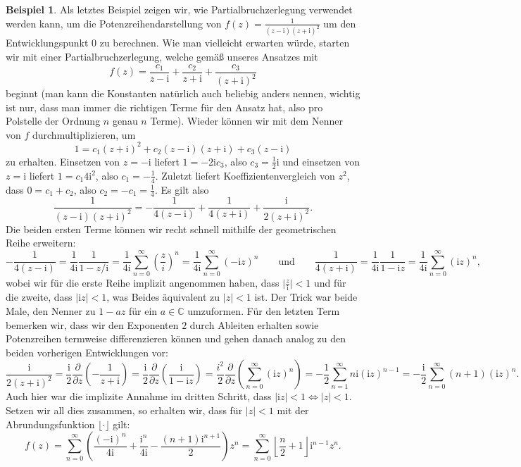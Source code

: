 \documentclass{article}
\theoremstyle{plain}
\theoremstyle{definition}
\newtheorem{example}{Beispiel}
\newcommand{\iu}{\mathrm{i}}
\begin{document}
\begin{example}
	Als letztes Beispiel zeigen wir, wie Partialbruchzerlegung verwendet werden kann, um die Potenzreihendarstellung von $f(z) = \frac{1}{(z - \iu)(z + \iu)^2}$ um den Entwicklungspunkt $0$ zu berechnen.
	Wie man vielleicht erwarten würde, starten wir mit einer Partialbruchzerlegung, welche gemäß unseres Ansatzes mit
	\[
		f(z) = \frac{c_1}{z - \iu} + \frac{c_2}{z + \iu} + \frac{c_3}{(z + \iu)^2}
	\]
	beginnt (man kann die Konstanten natürlich auch beliebig anders nennen, wichtig ist nur, dass man immer die richtigen Terme für den Ansatz hat, also pro Polstelle der Ordnung $n$ genau $n$ Terme).
	Wieder können wir mit dem Nenner von $f$ durchmultiplizieren, um
	\[
		1 = c_1 (z + \iu)^2 + c_2 (z - \iu)(z + \iu) + c_3 (z - \iu)
	\]
	zu erhalten.
	Einsetzen von $z = -\iu$ liefert $1 = -2 \iu c_3$, also $c_3 = \frac{1}{2}\iu$ und einsetzen von $z = \iu$ liefert $1 = c_1 4 \iu^2$, also $c_1 = -\frac{1}{4}$.
	Zuletzt liefert Koeffizientenvergleich von $z^2$, dass $0 = c_1 + c_2$, also $c_2 = - c_1 = \frac{1}{4}$.
	Es gilt also
	\[
		\frac{1}{(z - \iu)(z + \iu)^2} = -\frac{1}{4(z - \iu)} + \frac{1}{4(z + \iu)} + \frac{\iu}{2 (z + \iu)^2}.
	\]
	Die beiden ersten Terme können wir recht schnell mithilfe der geometrischen Reihe erweitern:
	\[
		-\frac{1}{4(z - \iu)} = \frac{1}{4\iu} \frac{1}{1 - z/\iu} = \frac{1}{4\iu} \sum_{n = 0}^{\infty} \left(\frac{z}{i}\right)^n = \frac{1}{4\iu} \sum_{n = 0}^{\infty} \left(- \iu z \right)^n \qquad \text{und} \qquad \frac{1}{4(z + \iu)} = \frac{1}{4\iu} \frac{1}{1 - \iu z} = \frac{1}{4 \iu} \sum_{n = 0}^{\infty} (\iu z)^n,
	\]
	wobei wir für die erste Reihe implizit angenommen haben, dass $\lvert \frac{z}{\iu} \rvert < 1$ und für die zweite, dass $\lvert \iu z \rvert < 1$, was Beides äquivalent zu $\lvert z \rvert < 1$ ist.
	Der Trick war beide Male, den Nenner zu $1 - az$ für ein $a \in \mathbb{C}$ umzuformen.
	Für den letzten Term bemerken wir, dass wir den Exponenten $2$ durch Ableiten erhalten sowie Potenzreihen termweise differenzieren können und gehen danach analog zu den beiden vorherigen Entwicklungen vor:
	\[
		\frac{\iu}{2(z + \iu)^2} = \frac{\iu}{2} \frac{\partial}{\partial z} \left( - \frac{1}{z + \iu} \right) = \frac{\iu}{2} \frac{\partial}{\partial z} \left( \frac{\iu}{1 - \iu z}\right) = \frac{i^2}{2} \frac{\partial}{\partial z} \left( \sum_{n = 0}^{\infty} (\iu z)^n \right) = -\frac{1}{2} \sum_{n = 1}^{\infty} n \iu (\iu z)^{n - 1} = - \frac{\iu}{2} \sum_{n = 0}^{\infty} (n + 1) (\iu z)^n.
	\]
	Auch hier war die implizite Annahme im dritten Schritt, dass $\lvert \iu z \rvert < 1 \iff \lvert z \rvert < 1$.
	Setzen wir all dies zusammen, so erhalten wir, dass für $\lvert z \rvert < 1$ mit der Abrundungsfunktion $\lfloor \cdot \rfloor$ gilt:
	\[
		f(z) = \sum_{n = 0}^{\infty} \left( \frac{(-\iu)^n}{4\iu} + \frac{\iu^n}{4 \iu} - \frac{(n + 1) \iu^{n+1}}{2} \right) z^n = \sum_{n = 0}^{\infty} \left\lfloor \frac{n}{2} + 1 \right\rfloor \iu^{n-1} z^n.
	\]
\end{example}
\end{document}
